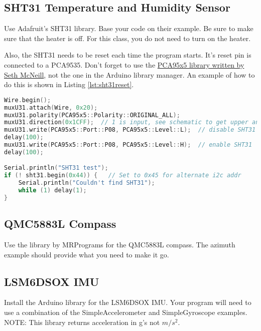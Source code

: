\subsection{SHT31 Temperature and Humidity Sensor}
Use Adafruit's SHT31 library. Base your code on their example. Be sure 
to make sure that the heater is off. For this class, you do not need to 
turn on the heater.

Also, the SHT31 needs to be reset each time the program starts. It's 
reset pin is connected to a PCA9535. Don't forget to use the 
\href{https://github.com/semcneil/PCA95x5}{PCA95x5 library written by Seth McNeill}, 
not the one in the Arduino library manager. An example of how to do this
is shown in Listing \ref{lst:sht31reset}.

\begin{lstlisting}[caption={This listing shows how to reset the SHT31.},
label={lst:sht31reset},language=C++]
Wire.begin();
muxU31.attach(Wire, 0x20);
muxU31.polarity(PCA95x5::Polarity::ORIGINAL_ALL);
muxU31.direction(0x1CFF);  // 1 is input, see schematic to get upper and lower bytes
muxU31.write(PCA95x5::Port::P08, PCA95x5::Level::L);  // disable SHT31
delay(100);
muxU31.write(PCA95x5::Port::P08, PCA95x5::Level::H);  // enable SHT31
delay(100);

Serial.println("SHT31 test");
if (! sht31.begin(0x44)) {   // Set to 0x45 for alternate i2c addr
    Serial.println("Couldn't find SHT31");
    while (1) delay(1);
}
\end{lstlisting}

\subsection{QMC5883L Compass}
Use the library by MRPrograms for the QMC5883L compass. The azimuth example 
should provide what you need to make it go.

\subsection{LSM6DSOX IMU}
Install the Arduino library for the LSM6DSOX IMU. Your program will need 
to use a combination of the SimpleAccelerometer and SimpleGyroscope examples.
NOTE: This library returns acceleration in g's not $m/s^2$.

